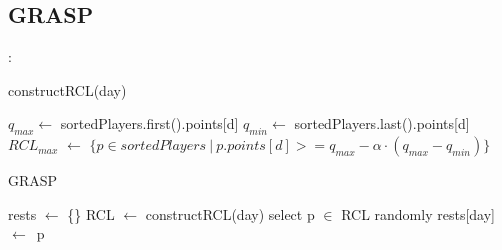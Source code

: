 \documentclass[9pt, aspectratio=169, xcolor=table]{beamer}
\begin{document}
\subsection{GRASP}
\begin{frame}{\secname: \subsecname}
\begin{algorithm}[H]
    \caption{constructRCL(day)} 
    \label{rcl}
    \begin{algorithmic}[1]
	\State $q_{max} \leftarrow $ sortedPlayers.first().points[d]
	\State $q_{min} \leftarrow$ sortedPlayers.last().points[d]
	\State $RCL_{max}$ $\leftarrow$ $\{p \in sortedPlayers\ |\ p.points[d] >= q_{max} - \alpha \cdot (q_{max} - q_{min})\}$
    \end{algorithmic} 
\end{algorithm}




\begin{algorithm}[H]
	\caption{GRASP} 
	\begin{algorithmic}[1]
	  \State rests $\leftarrow$ \{\}
	      \State RCL $\leftarrow$ constructRCL(day)
	      \State select p $\in$ RCL randomly
	      \State rests[day]\ $\leftarrow$\ p
	    \EndFor
	\end{algorithmic} 
\end{algorithm}
\end{frame}
\end{document}
